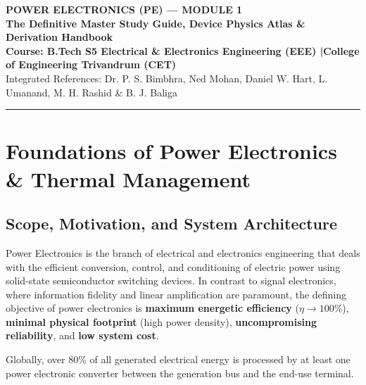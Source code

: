 \documentclass[11pt,a4paper]{article}
\begin{document}
\begin{center}
  {\huge\bfseries\color{navyprimary} POWER ELECTRONICS (PE) --- MODULE 1}\\[1.5ex]
  {\Large\bfseries\color{accentblue} The Definitive Master Study Guide, Device Physics Atlas \& Derivation Handbook}\\[1.5ex]
  {\normalsize\bfseries Course: B.Tech S5 Electrical \& Electronics Engineering (EEE) \quad|\quad College of Engineering Trivandrum (CET)}\\[0.8ex]
  {\small Integrated References: Dr. P. S. Bimbhra, Ned Mohan, Daniel W. Hart, L. Umanand, M. H. Rashid \& B. J. Baliga}
\end{center}
\vspace{-1em}
\noindent\textcolor{accentblue}{\rule{\textwidth}{1.5pt}}
\vspace{0.5em}

\tableofcontents
\newpage

\section{Foundations of Power Electronics \& Thermal Management}

\subsection{Scope, Motivation, and System Architecture}

Power Electronics is the branch of electrical and electronics engineering that deals with the efficient conversion, control, and conditioning of electric power using solid-state semiconductor switching devices. In contrast to signal electronics, where information fidelity and linear amplification are paramount, the defining objective of power electronics is \textbf{maximum energetic efficiency} ($\eta \to 100\%$), \textbf{minimal physical footprint} (high power density), \textbf{uncompromising reliability}, and \textbf{low system cost}.

Globally, over 80\% of all generated electrical energy is processed by at least one power electronic converter between the generation bus and the end-use terminal.
\end{document}
